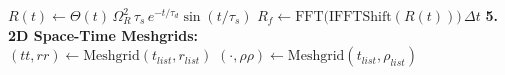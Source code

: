 \documentclass{article}
\begin{document}
\begin{algorithm}[H]
{    $R(t) \gets \Theta(t)\,\Omega_R^2\,\tau_s\, e^{-t/\tau_d}\sin(t/\tau_s)$ 
    $R_f \gets \text{FFT}\big(\text{IFFTShift}(R(t))\big)\,\Delta t$ 
    \BlankLine
    \textbf{5. 2D Space-Time Meshgrids:} \\
    $(tt, rr) \gets \text{Meshgrid}(t_{list}, r_{list})$ 
    $(\cdot, \rho\rho) \gets \text{Meshgrid}(t_{list}, \rho_{list})$ 
}
\caption{Grid and operator construction (Part 1/2): temporal/radial grids, dispersion, nonlinear operators (\texttt{build\_grids}).}
\label{alg:build_grids_1}
\end{algorithm}

\newpage
\end{document}
